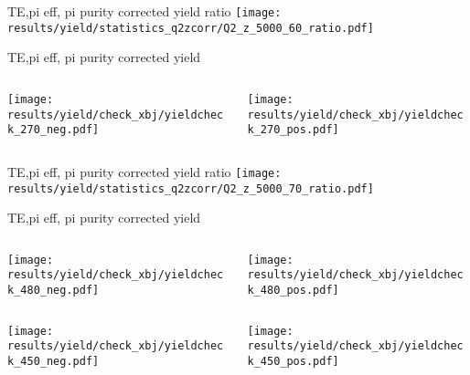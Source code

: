\begin{frame}{TE,pi eff, pi purity corrected yield ratio}
\texttt{[image: results/yield/statistics\_q2zcorr/Q2\_z\_5000\_60\_ratio.pdf]}
\end{frame}
\begin{frame}{TE,pi eff, pi purity corrected yield}
\begin{columns}
\begin{column}[T]{0.5\textwidth}
\texttt{[image: results/yield/check\_xbj/yieldcheck\_270\_neg.pdf]}
\end{column}
\begin{column}[T]{0.5\textwidth}
\texttt{[image: results/yield/check\_xbj/yieldcheck\_270\_pos.pdf]}
\end{column}
\end{columns}
\end{frame}
\begin{frame}{TE,pi eff, pi purity corrected yield ratio}
\texttt{[image: results/yield/statistics\_q2zcorr/Q2\_z\_5000\_70\_ratio.pdf]}
\end{frame}
\begin{frame}{TE,pi eff, pi purity corrected yield}
\begin{columns}
\begin{column}[T]{0.5\textwidth}
\texttt{[image: results/yield/check\_xbj/yieldcheck\_480\_neg.pdf]}
\end{column}
\begin{column}[T]{0.5\textwidth}
\texttt{[image: results/yield/check\_xbj/yieldcheck\_480\_pos.pdf]}
\end{column}
\end{columns}
\begin{columns}
\begin{column}[T]{0.5\textwidth}
\texttt{[image: results/yield/check\_xbj/yieldcheck\_450\_neg.pdf]}
\end{column}
\begin{column}[T]{0.5\textwidth}
\texttt{[image: results/yield/check\_xbj/yieldcheck\_450\_pos.pdf]}
\end{column}
\end{columns}
\end{frame}
